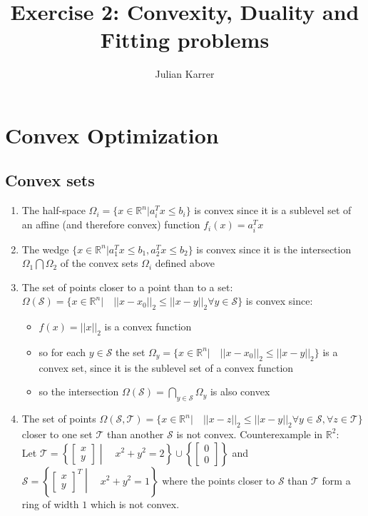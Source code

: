 \documentclass[oneside, a4paper]{book}
\author{Julian Karrer}
\title{Exercise 2: Convexity, Duality and Fitting problems}
\newcommand\abss[1]{\left|\left|#1\right|\right|}
\newcommand\br[1]{\left(#1\right)}
\begin{document}
\chapter{Convex Optimization}
\section{Convex sets}
\begin{enumerate}
    \item The half-space $\Omega_i = \{ x\in\mathds{R}^n | a_i^T x\leq b_i \}$ is convex since it is a sublevel set of an affine (and therefore convex) function $f_i(x) =  a_i^T x$
    \item The wedge $\{x\in\mathds{R}^n | a_1^T x \leq b_1, a_2^T x \leq b_2\}$ is convex since it is the intersection $\Omega_1 \bigcap \Omega_2$ of the convex sets $\Omega_i$ defined above
    \item The set of points closer to a point than to a set:\\
     $\Omega\br{\mathcal{S}} = \{ x\in\mathds{R}^n |\quad \abss{x - x_0}_2 \leq \abss{x - y}_2 \forall y \in \mathcal{S} \}$ is convex since:
    \begin{itemize}
        \item $f(x) = \abss{x}_2$ is a convex function
        \item so for each $y\in\mathcal{S}$ the set $\Omega_y = \{ x\in\mathds{R}^n |\quad  \abss{x - x_0}_2 \leq \abss{x - y}_2 \}$ is a convex set, since it is the sublevel set of a convex function
        \item so the intersection $\Omega\br{\mathcal{S}} = \bigcap_{y\in\mathcal{S}}\Omega_y$ is also convex
    \end{itemize} 
    \item The set of points $\Omega\br{\mathcal{S}, \mathcal{T}} = \{ 
        x\in\mathds{R}^n |\quad  
        \abss{x - z}_2 \leq \abss{x - y}_2 \forall y \in \mathcal{S}, \forall z\in\mathcal{T}
     \}$ closer to one set $\mathcal{T}$ than another $\mathcal{S}$ is not convex. Counterexample in $\mathds{R}^2$:\\ Let $\mathcal{T} = \left\{ \begin{bmatrix}x \\ y\end{bmatrix} \middle| \quad x^2+y^2 = 2 \right\} \cup \left\{\begin{bmatrix}0 \\ 0\end{bmatrix} \right\}$ and  $\mathcal{S} = \left\{ \begin{bmatrix}x \\ y\end{bmatrix}^T \middle| \quad x^2+y^2 = 1\right\}$ where the points closer to $\mathcal{S}$ than $\mathcal{T}$ form a ring of width $1$ which is not convex.
\end{enumerate}
\end{document}
